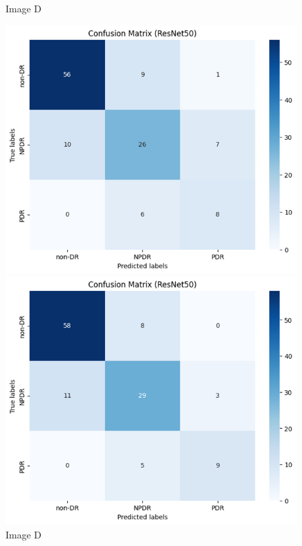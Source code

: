 \begin{figure}[H]
\begin{minipage}[t]{0.475\textwidth}
            \caption{Image D}
            \label{fig:2b}
        \end{minipage}
        \begin{minipage}[t]{0.475\textwidth} %
            \includegraphics[draft=false, width=\textwidth]{gambar/confusionMatrixResnet50class-weighted_bestTrain.png} 
            \caption{Image D}
            \label{fig:2b}
        \end{minipage}
        \begin{minipage}[t]{0.475\textwidth} %
            \includegraphics[draft=false, width=\textwidth]{gambar/confusionMatrixResnet50class-weighted_bestVal.png} 

\end{minipage}
\end{figure}
